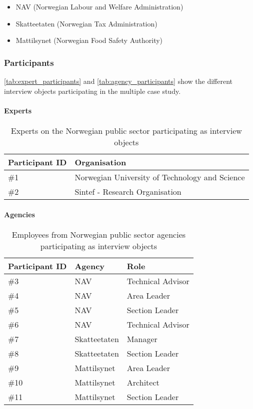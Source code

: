 \begin{itemize}
    \item NAV (Norwegian Labour and Welfare Administration)
    \item Skatteetaten (Norwegian Tax Administration)
    \item Mattilsynet (Norwegian Food Safety Authority)
\end{itemize}

\subsubsection{Participants}
\autoref{tab:expert_participants} and \autoref{tab:agency_participants} show the different interview objects participating in the multiple case study.

\paragraph{Experts} \hspace{0cm}
\begin{table}[H]
\centering
\begin{tabular}{|l|l|}
\hline
\textbf{Participant ID} & \textbf{Organisation} \\ \hline
\#1 & Norwegian University of Technology and Science \\ \hline
\#2 & Sintef - Research Organisation\\ \hline
\end{tabular}
\caption{Experts on the Norwegian public sector participating as interview objects}
\label{tab:expert_participants}
\end{table}

\paragraph{Agencies} \hspace{0cm}
\begin{table}[H]
\centering
\begin{tabular}{|l|l|l|}
\hline
\textbf{Participant ID} & \textbf{Agency} & \textbf{Role} \\ \hline
\#3 & NAV & Technical Advisor \\ \hline
\#4 & NAV & Area Leader \\ \hline
\#5 & NAV & Section Leader \\ \hline
\#6 & NAV & Technical Advisor \\ \hline
\#7 & Skatteetaten & Manager \\ \hline
\#8 & Skatteetaten & Section Leader \\ \hline
\#9 & Mattilsynet & Area Leader \\ \hline
\#10 & Mattilsynet & Architect \\ \hline
\#11 & Mattilsynet & Section Leader \\ \hline
\end{tabular}
\caption{Employees from Norwegian public sector agencies participating as interview objects}
\label{tab:agency_participants}
\end{table}

